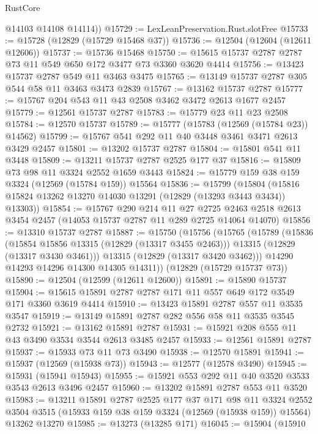 \begin{lexlean}{RustCore}
\begin{coremodule}
        @14103
        @14108
        @14114))
@15729 := LexLeanPreservation.Rust.slotFree
@15733 := @15728 (@12829 (@15729 @15468 @37))
@15736 := @12504 (@12604 (@12611 @12606))
@15737 := @15736 @15468
@15750 := @15615 @15737 @2787 @2787 @73 @11 @549 @650 @172 @3477 @73 @3360 @3620 @4414
@15756 := @13423 @15737 @2787 @549 @11 @3463 @3475
@15765 := @13149 @15737 @2787 @305 @544 @58 @11 @3463 @3473 @2839
@15767 := @13162 @15737 @2787
@15777 := @15767 @204 @543 @11 @43 @2508 @3462 @3472 @2613 @1677 @2457
@15779 := @12561 @15737 @2787
@15783 := @15779 @23 @11 @23 @2508
@15784 := @12570 @15737
@15789 := @15777 (@15783 (@12569 (@15784 @23)) @14562)
@15799 := @15767 @541 @292 @11 @40 @3448 @3461 @3471 @2613 @3429 @2457
@15801 := @13202 @15737 @2787
@15804 := @15801 @541 @11 @3448
@15809 := @13211 @15737 @2787 @2525 @177 @37
@15816 := @15809 @73 @98 @11 @3324 @2552 @1659 @3443
@15824 := @15779 @159 @38 @159 @3324 (@12569 (@15784 @159)) @15564
@15836 := @15799
    (@15804 (@15816 @15824 @13262 @13270 @14030 @13291 (@12829 (@13293 @3443 @3434)) @13303))
@15854 := @15767
    @290
    @214
    @11
    @27
    @2725
    @2463
    @2518
    @2613
    @3454
    @2457
    (@14053 @15737 @2787 @11 @289 @2725 @14064 @14070)
@15856 := @13310 @15737 @2787
@15887 := @15750
    (@15756
      (@15765
        (@15789
          (@15836
            (@15854 @15856 @13315 (@12829 (@13317 @3455 @2463)))
            @13315
            (@12829 (@13317 @3430 @3461)))
          @13315
          (@12829 (@13317 @3420 @3462)))
        @14290
        @14293
        @14296
        @14300
        @14305
        @14311))
    (@12829 (@15729 @15737 @73))
@15890 := @12504 (@12599 (@12611 @12600))
@15891 := @15890 @15737
@15904 := @15615 @15891 @2787 @2787 @171 @11 @557 @649 @172 @3549 @171 @3360 @3619 @4414
@15910 := @13423 @15891 @2787 @557 @11 @3535 @3547
@15919 := @13149 @15891 @2787 @282 @556 @58 @11 @3535 @3545 @2732
@15921 := @13162 @15891 @2787
@15931 := @15921 @208 @555 @11 @43 @3490 @3534 @3544 @2613 @3485 @2457
@15933 := @12561 @15891 @2787
@15937 := @15933 @73 @11 @73 @3490
@15938 := @12570 @15891
@15941 := @15937 (@12569 (@15938 @73))
@15943 := @12577 (@12578 @3490)
@15945 := @15931 (@15941 @15943)
@15955 := @15921 @553 @292 @11 @40 @3520 @3533 @3543 @2613 @3496 @2457
@15960 := @13202 @15891 @2787 @553 @11 @3520
@15983 := @13211
    @15891
    @2787
    @2525
    @177
    @37
    @171
    @98
    @11
    @3324
    @2552
    @3504
    @3515
    (@15933 @159 @38 @159 @3324 (@12569 (@15938 @159)) @15564)
    @13262
    @13270
@15985 := @13273 (@13285 @171)
@16045 := @15904
    (@15910

\end{coremodule}
\end{lexlean}
